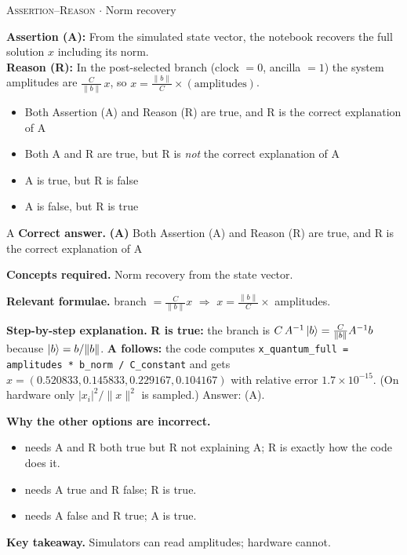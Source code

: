 \documentclass[11pt,a4paper]{article}
\newcommand{\optlabel}[1]{\textbf{(#1)}}
\newcommand{\correctlabel}[1]{\textcolor{okgreen}{\textbf{(#1)}\,\ding{51}}}
\newenvironment{qitem}[1]{\begin{list}{}{\setlength{\leftmargin}{3.3em}\setlength{\labelwidth}{3.1em}%
  \setlength{\labelsep}{0.2em}\setlength{\topsep}{3pt}\setlength{\parsep}{3pt}}\item[\textbf{Q.#1}\hfill]}{\end{list}}
\newcommand{\qsep}{\par\vspace{2pt}{\color{black!15}\hrule}\vspace{4pt}}
\newcommand{\qmeta}[2]{{\footnotesize\color{black!60}\textsc{#1} \;$\cdot$\; #2}\par}
\begin{document}
\begin{qitem}{49}
\qmeta{Assertion--Reason}{Norm recovery}
\textbf{Assertion (A):} From the simulated state vector, the notebook recovers the full solution $x$ including its norm.\\[1mm]
\textbf{Reason (R):} In the post-selected branch (clock $= 0$, ancilla $= 1$) the system amplitudes are $\tfrac{C}{\|b\|}\,x$, so $x = \tfrac{\|b\|}{C}\times(\text{amplitudes})$.
\begin{itemize}[leftmargin=2.6em, labelsep=0.4em, itemsep=2pt, topsep=3pt]
\item[\correctlabel{A}] Both Assertion (A) and Reason (R) are true, and R is the correct explanation of A
\item[\optlabel{B}] Both A and R are true, but R is \emph{not} the correct explanation of A
\item[\optlabel{C}] A is true, but R is false
\item[\optlabel{D}] A is false, but R is true
\end{itemize}
\end{qitem}
\begin{solbox}{A}
\textbf{\color{brand}Correct answer.} \textcolor{okgreen}{\textbf{(A)}} Both Assertion (A) and Reason (R) are true, and R is the correct explanation of A

\textbf{\color{brand}Concepts required.} Norm recovery from the state vector.

\textbf{\color{brand}Relevant formulae.} branch $= \frac{C}{\|b\|}x$ $\Rightarrow$ $x = \frac{\|b\|}{C}\times$ amplitudes.

\textbf{\color{brand}Step-by-step explanation.} \textbf{R is true:} the branch is $C\,A^{-1}\ket b = \tfrac{C}{\|b\|}A^{-1}b$ because $\ket b = b/\|b\|$.
\textbf{A follows:} the code computes \texttt{x\_quantum\_full = amplitudes * b\_norm / C\_constant} and gets $x = (0.520833, 0.145833, 0.229167, 0.104167)$ with relative error $1.7\times10^{-15}$.
(On hardware only $|x_i|^2/\|x\|^2$ is sampled.) Answer: (A).

\textbf{\color{brand}Why the other options are incorrect.}
\begin{itemize}[leftmargin=2.4em, itemsep=1pt, topsep=2pt]
\item[\textbf{(B)}] needs A and R both true but R not explaining A; R is exactly how the code does it.
\item[\textbf{(C)}] needs A true and R false; R is true.
\item[\textbf{(D)}] needs A false and R true; A is true.
\end{itemize}
\textbf{\color{brand}Key takeaway.} Simulators can read amplitudes; hardware cannot.
\end{solbox}
\qsep
\end{document}
